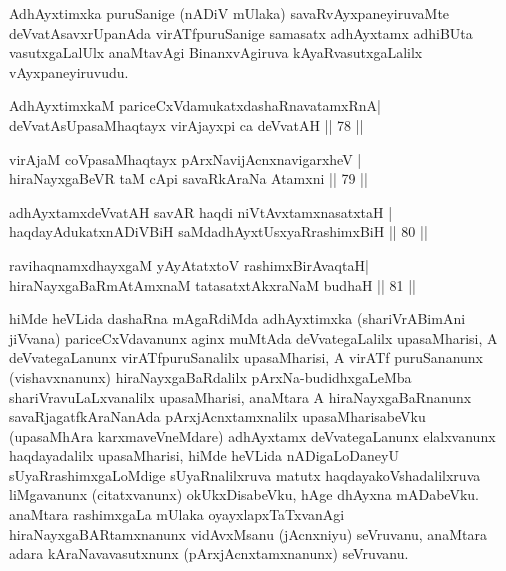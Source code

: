 \begin{artha}
AdhAyxtimxka puruSanige (nADiV mUlaka) savaRvAyxpaneyiruvaMte deVvatAsavxrUpanAda virATfpuruSanige samasatx adhAyxtamx adhiBUta vasutxgaLalUlx anaMtavAgi BinanxvAgiruva kAyaRvasutxgaLalilx vAyxpaneyiruvudu.
\end{artha}


\begin{shl}
AdhAyxtimxkaM pariceCxVdamukatxdashaRnavatamxRnA|\\
deVvatAsUpasaMhaqtayx virAjayxpi ca deVvatAH \hfill || 78 || 
\end{shl}

\begin{shl}
virAjaM coVpasaMhaqtayx pArxNavijAcnxnavigarxheV |\\
hiraNayxgaBeVR taM cApi savaRkAraNa Atamxni \hfill || 79 || 
\end{shl}

\begin{shl}
adhAyxtamxdeVvatAH savAR haqdi niVtAvx\s \s tamxnasatxtaH |\\
haqdayAdukatxnADiVBiH saMdadhAyxtUsxyaRrashimxBiH \hfill || 80 || 
\end{shl}

\begin{shl}
ravihaqnamxdhayxgaM yAyAtatxtoV rashimxBirAvaqtaH|\\
hiraNayxgaBaRmAtAmxnaM tatasatxtAkxraNaM budhaH \hfill || 81 || 
\end{shl}

\begin{artha}
hiMde heVLida dashaRna mAgaRdiMda adhAyxtimxka (shariVrABimAni jiVvana) pariceCxVdavanunx aginx muMtAda deVvategaLalilx upasaMharisi, A deVvategaLanunx virATfpuruSanalilx upasaMharisi, A virATf puruSananunx (vishavxnanunx) hiraNayxgaBaRdalilx pArxNa-budidhxgaLeMba shariVravuLaLxvanalilx upasaMharisi, anaMtara A hiraNayxgaBaRnanunx savaRjagatfkAraNanAda pArxjAcnxtamxnalilx upasaMharisabeVku (upasaMhAra karxmaveVneMdare) adhAyxtamx deVvategaLanunx elalxvanunx haqdayadalilx upasaMharisi, hiMde heVLida nADigaLoDaneyU sUyaRrashimxgaLoMdige sUyaRnalilxruva matutx haqdayakoVshadalilxruva liMgavanunx (citatxvanunx) okUkxDisabeVku, hAge dhAyxna mADabeVku. anaMtara rashimxgaLa mUlaka oyayxlapxTaTxvanAgi hiraNayxgaBARtamxnanunx vidAvxMsanu (jAcnxniyu) seVruvanu, anaMtara adara kAraNavavasutxnunx (pArxjAcnxtamxnanunx) seVruvanu.
\end{artha}

